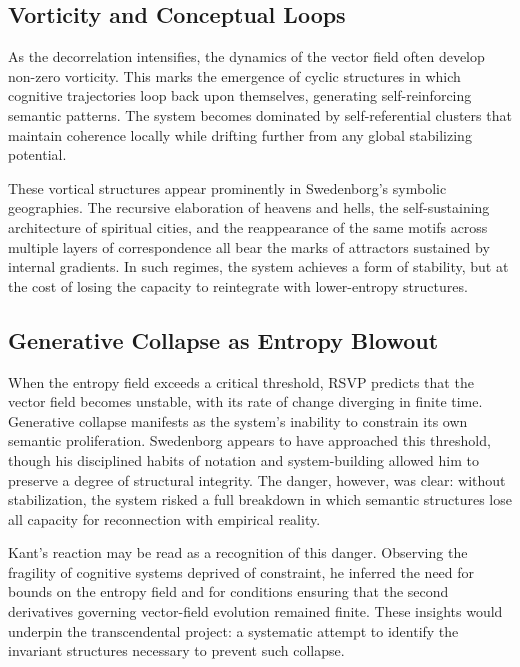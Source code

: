 \documentclass[12pt]{article}
\begin{document}
\subsection{Vorticity and Conceptual Loops}

As the decorrelation intensifies, the dynamics of the vector field often 
develop non-zero vorticity. This marks the emergence of cyclic structures in 
which cognitive trajectories loop back upon themselves, generating 
self-reinforcing semantic patterns. The system becomes dominated by 
self-referential clusters that maintain coherence locally while drifting 
further from any global stabilizing potential.

These vortical structures appear prominently in Swedenborg’s symbolic 
geographies. The recursive elaboration of heavens and hells, the 
self-sustaining architecture of spiritual cities, and the reappearance of 
the same motifs across multiple layers of correspondence all bear the marks 
of attractors sustained by internal gradients. In such regimes, the system 
achieves a form of stability, but at the cost of losing the capacity to 
reintegrate with lower-entropy structures. 

\subsection{Generative Collapse as Entropy Blowout}

When the entropy field exceeds a critical threshold, RSVP predicts that the 
vector field becomes unstable, with its rate of change diverging in finite 
time. Generative collapse manifests as the system’s inability to constrain 
its own semantic proliferation. Swedenborg appears to have approached this 
threshold, though his disciplined habits of notation and system-building 
allowed him to preserve a degree of structural integrity. The danger, however, 
was clear: without stabilization, the system risked a full breakdown in which 
semantic structures lose all capacity for reconnection with empirical reality.

Kant’s reaction may be read as a recognition of this danger. Observing the 
fragility of cognitive systems deprived of constraint, he inferred the need 
for bounds on the entropy field and for conditions ensuring that the second 
derivatives governing vector-field evolution remained finite. These insights 
would underpin the transcendental project: a systematic attempt to identify 
the invariant structures necessary to prevent such collapse.
\end{document}
